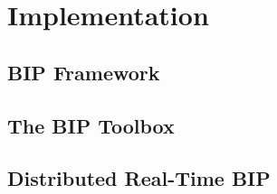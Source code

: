 \chapter{Implementation}
\minitoc
\section{BIP Framework}
\section{The BIP Toolbox}
\section{Distributed Real-Time BIP}
